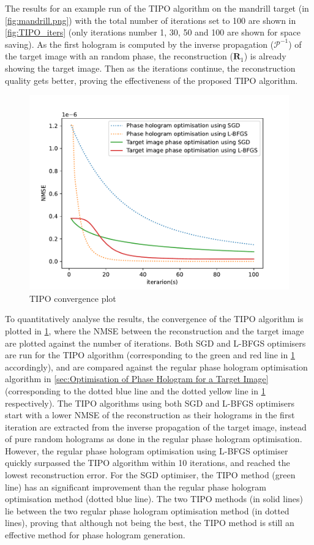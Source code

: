 The results for an example run of the TIPO algorithm on the mandrill target (in \cref{fig:mandrill.png}) with the total number of iterations set to 100 are shown in \cref{fig:TIPO_iters} (only iterations number 1, 30, 50 and 100 are shown for space saving). As the first hologram is computed by the inverse propagation ($\mathcal{P}^{-1}$) of the target image with an random phase, the reconstruction ($\textbf{R}_1$) is already showing the target image. Then as the iterations continue, the reconstruction quality gets better, proving the effectiveness of the proposed TIPO algorithm.

\begin{figure}[H]
	\centering
	\includegraphics[width=\textwidth]{TIPO_convergence.pdf}
	\caption{TIPO convergence plot}
	\label{fig:TIPO_convergence}
\end{figure}

To quantitatively analyse the results, the convergence of the TIPO algorithm is plotted in \cref{fig:TIPO_convergence}, where the NMSE between the reconstruction and the target image are plotted against the number of iterations. Both SGD and L-BFGS optimisers are run for the TIPO algorithm (corresponding to the green and red line in \cref{fig:TIPO_convergence} accordingly), and are compared against the regular phase hologram optimisation algorithm in \cref{sec:Optimisation of Phase Hologram for a Target Image} (corresponding to the dotted blue line and the dotted yellow line in \cref{fig:TIPO_convergence} respectively). The TIPO algorithms using both SGD and L-BFGS optimisers start with a lower NMSE of the reconstruction as their holograms in the first iteration are extracted from the inverse propagation of the target image, instead of pure random holograms as done in the regular phase hologram optimisation. However, the regular phase hologram optimisation using L-BFGS optimiser quickly surpassed the TIPO algorithm within 10 iterations, and reached the lowest reconstruction error. For the SGD optimiser, the TIPO method (green line) has an significant improvement than the regular phase hologram optimisation method (dotted blue line). The two TIPO methods (in solid lines) lie between the two regular phase hologram optimisation method (in dotted lines), proving that although not being the best, the TIPO method is still an effective method for phase hologram generation.